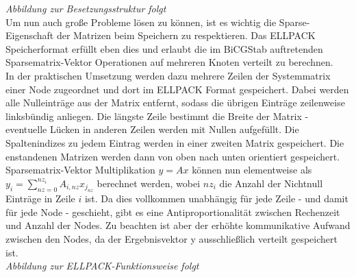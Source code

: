 \textit{Abbildung zur Besetzungsstruktur folgt}\\

Um nun auch große Probleme lösen zu können, ist es wichtig die Sparse-Eigenschaft der Matrizen beim Speichern zu respektieren. Das ELLPACK Speicherformat erfüllt eben dies und erlaubt die im BiCGStab auftretenden Sparsematrix-Vektor Operationen auf mehreren Knoten verteilt zu berechnen.\\
In der praktischen Umsetzung werden dazu mehrere Zeilen der Systemmatrix einer Node zugeordnet und dort im ELLPACK Format gespeichert. Dabei werden alle Nulleinträge aus der Matrix entfernt, sodass die übrigen Einträge zeilenweise linksbündig anliegen. Die längste Zeile bestimmt die Breite der Matrix - eventuelle Lücken in anderen Zeilen werden mit Nullen aufgefüllt. Die Spaltenindizes zu jedem Eintrag werden in einer zweiten Matrix gespeichert. Die enstandenen Matrizen werden dann von oben nach unten orientiert gespeichert. Sparsematrix-Vektor Multiplikation $y=Ax$ können nun elementweise als $y_i = \sum \limits_{nz=0}^{nz_i} A_{i,nz} x_{j_{nz}}$ berechnet werden, wobei $nz_i$ die Anzahl der Nichtnull Einträge in Zeile $i$ ist. Da dies vollkommen unabhängig für jede Zeile - und damit für jede Node - geschieht, gibt es eine Antiproportionalität zwischen Rechenzeit und Anzahl der Nodes. Zu beachten ist aber der erhöhte kommunikative Aufwand zwischen den Nodes, da der Ergebnisvektor y ausschließlich verteilt gespeichert ist.\\

\textit{Abbildung zur ELLPACK-Funktionsweise folgt}\\
